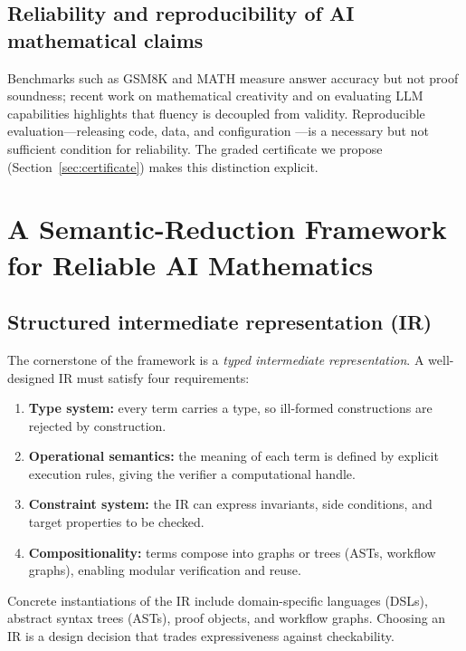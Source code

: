 \documentclass[11pt,a4paper]{article}
\theoremstyle{definition}
\theoremstyle{plain}
\begin{document}
\subsection{Reliability and reproducibility of AI mathematical claims}
\label{sec:rel-repro}

Benchmarks such as GSM8K \cite{cobbe2021} and MATH \cite{hendrycks2021} measure answer accuracy but not
proof soundness; recent work on mathematical creativity and on evaluating LLM capabilities
\cite{chen2025deepmath,frieder2023} highlights that fluency is decoupled from validity. Reproducible
evaluation---releasing code, data, and configuration \cite{silver2018,sutton2018}---is a necessary but
not sufficient condition for reliability. The graded certificate we propose
(Section~\ref{sec:certificate}) makes this distinction explicit.

\section{A Semantic-Reduction Framework for Reliable AI Mathematics}
\label{sec:framework}

\subsection{Structured intermediate representation (IR)}
\label{sec:ir}

The cornerstone of the framework is a \emph{typed intermediate representation}. A well-designed IR must
satisfy four requirements:
\begin{enumerate}[leftmargin=*]
  \item \textbf{Type system:} every term carries a type, so ill-formed constructions are rejected by
  construction.
  \item \textbf{Operational semantics:} the meaning of each term is defined by explicit execution rules,
  giving the verifier a computational handle.
  \item \textbf{Constraint system:} the IR can express invariants, side conditions, and target
  properties to be checked.
  \item \textbf{Compositionality:} terms compose into graphs or trees (ASTs, workflow graphs), enabling
  modular verification and reuse.
\end{enumerate}
Concrete instantiations of the IR include domain-specific languages (DSLs), abstract syntax trees
(ASTs), proof objects, and workflow graphs. Choosing an IR is a design decision that trades expressiveness
against checkability.
\end{document}
